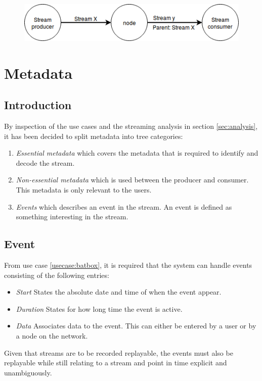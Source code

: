 \begin{figure}[h!]
	\includegraphics[width=1\textwidth]{figures/stream-graph}
\end{figure}

\section{Metadata}
\subsection{Introduction}

By inspection of the use cases and the streaming analysis in section \ref{sec:analysis}, it has been decided to split metadata into tree categories:
\begin{enumerate}
	\item \textit{Essential metadata} which covers the metadata that is required to identify and decode the stream.
	\item \textit{Non-essential metadata} which is used between the producer and consumer. This metadata is only relevant to the users.
	\item \textit{Events} which describes an event in the stream. An event is defined as something interesting in the stream.
\end{enumerate}

\subsection{Event}
From use case \ref{usecase:batbox}, it is required that the system can handle events consisting of the following entries:
\begin{itemize}
	\item \textit{Start} States the absolute date and time of when the event appear. 
	\item \textit{Duration} States for how long time the event is active.
	\item \textit{Data} Associates data to the event. This can either be entered by a user or by a node on the network.
\end{itemize}

Given that streams are to be recorded replayable, the events must also be replayable while still relating to a stream and point in time explicit and unambiguously.

